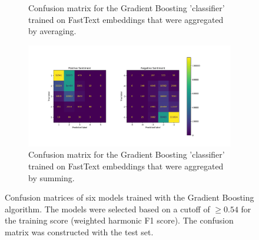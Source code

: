 \begin{figure}
\begin{subfigure}[b]{0.475\textwidth}
        \caption{Confusion matrix for the Gradient Boosting 'classifier' trained on FastText embeddings that were aggregated by averaging.}    
        \label{fig:grad_boost_av_ft}
    \end{subfigure}
    \hfill
    \begin{subfigure}[b]{0.475\textwidth}
        \centering
        \includegraphics[width=\textwidth]{images/grad_boost_sum_ft.pdf}
        \caption{Confusion matrix for the Gradient Boosting 'classifier' trained on FastText embeddings that were aggregated by summing.}    
        \label{fig:grad_boost_sum_ft}
    \end{subfigure}
    \caption{Confusion matrices of six models trained with the Gradient Boosting algorithm. The models were selected based on a cutoff of $\ge 0.54$ for the training score (weighted harmonic F1 score). The confusion matrix was constructed with the test set.} 
    \label{fig:confusion_gensim}
\end{figure}


